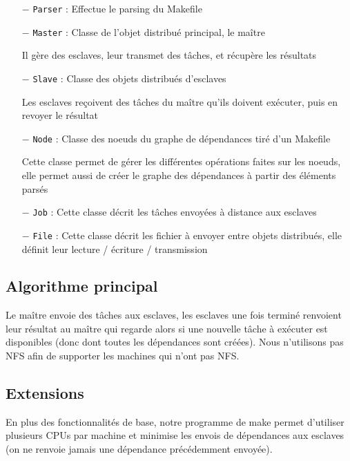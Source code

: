 \documentclass[a4paper, 11pt, titlepage]{article}
\begin{document}
\begin{itemize}

\item[$-$]
\lstinline!Parser! :
Effectue le parsing du Makefile

\item[$-$]
\lstinline!Master! :
Classe de l'objet distribué principal, le maître

Il gère des esclaves, leur transmet des tâches,
et récupère les résultats

\item[$-$]
\lstinline!Slave! :
Classe des objets distribués d'esclaves

Les esclaves reçoivent des tâches du maître qu'ils doivent exécuter,
puis en revoyer le résultat

\item[$-$]
\lstinline!Node! :
Classe des noeuds du graphe de dépendances tiré d'un Makefile

Cette classe permet de gérer les différentes opérations faites sur les noeuds, elle permet aussi de créer le graphe des dépendances à partir des éléments parsés


\item[$-$]
\lstinline!Job! :
Cette classe décrit les tâches envoyées à distance aux esclaves


\item[$-$]
\lstinline!File! :
Cette classe décrit les fichier à envoyer entre objets distribués,
elle définit leur lecture / écriture / transmission

\end{itemize}


\subsection {Algorithme principal}

Le maître envoie des tâches aux esclaves, les esclaves une fois terminé renvoient leur résultat au maître qui regarde alors si une nouvelle tâche à exécuter est disponibles (donc dont toutes les dépendances sont créées). Nous n'utilisons pas NFS afin de supporter les machines qui n'ont pas NFS.


\subsection {Extensions}

En plus des fonctionnalités de base, notre programme de make permet d'utiliser plusieurs CPUs par machine et minimise les envois de dépendances aux esclaves (on ne renvoie jamais une dépendance précédemment envoyée).
\end{document}
